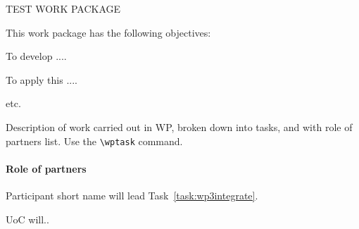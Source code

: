 
\begin{workpackage}{TEST WORK PACKAGE}
  \label{wp:test} %



  \makewptable %
    
  \begin{wpobjectives}
    This work package has the following objectives:
    \begin{enumerate*}
    \item To develop ....
    \item To apply this ....
    \item etc.
    \end{enumerate*}
  \end{wpobjectives}
  
  \begin{wpdescription}
 
    Description of work carried out in WP, broken down into tasks, and
    with role of partners list. Use the \texttt{\textbackslash wptask} command.

    
    \paragraph{Role of partners}
    \begin{description*}
    \item[Participant short name] will lead Task~\ref{task:wp3integrate}.
    \item[UoC] will..
    \end{description*}
  \end{wpdescription}
  

\end{workpackage}
